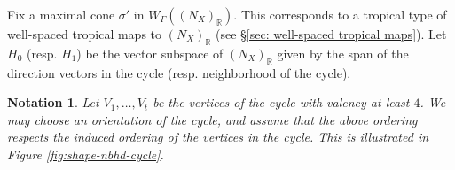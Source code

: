 \documentclass{article}
\def\R{\mathbb{R}}
\newtheorem{notation}[definition]{Notation}
\begin{document}
Fix a maximal cone $\sigma'$ in $W_{\Gamma}((N_X)_\R)$. This corresponds to a tropical type of well-spaced tropical maps to $(N_X)_\R$ (see \S\ref{sec: well-spaced tropical maps}). Let $H_0$ (resp. $H_1$) be the vector subspace of $(N_X)_{\mathbb{R}}$ given by the span of the direction vectors in the cycle (resp. neighborhood of the cycle). 


\begin{notation}
     \label{notation: shape nbhd cycle}
    Let $V_1,\ldots,V_t$ be the vertices of the cycle with valency at least $4$.
    We may choose an orientation of the cycle, and assume that the above ordering respects the induced ordering of the vertices in the cycle. This is illustrated in Figure \ref{fig:shape-nbhd-cycle}. 

    \begin{figure}[h]
        \centering
\end{figure}
\end{notation}
\end{document}
